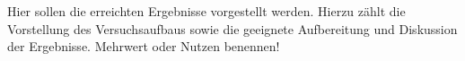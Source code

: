 Hier sollen die erreichten Ergebnisse vorgestellt werden. Hierzu zählt die Vorstellung des Versuchsaufbaus sowie die geeignete Aufbereitung und Diskussion der Ergebnisse. Mehrwert oder Nutzen benennen!
